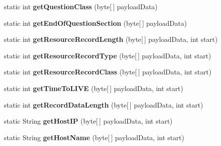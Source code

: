 \begin{DoxyCompactItemize}
\item 
\hypertarget{class_d_n_s_wrapper_aa75a7784f60a728e11bbd791bc3eaa7b}{static int {\bfseries get\-Question\-Class} (byte\mbox{[}$\,$\mbox{]} payload\-Data)}\label{class_d_n_s_wrapper_aa75a7784f60a728e11bbd791bc3eaa7b}

\item 
\hypertarget{class_d_n_s_wrapper_a4f45ea27c7c3190fdb77b68256ce60bb}{static int {\bfseries get\-End\-Of\-Question\-Section} (byte\mbox{[}$\,$\mbox{]} payload\-Data)}\label{class_d_n_s_wrapper_a4f45ea27c7c3190fdb77b68256ce60bb}

\item 
\hypertarget{class_d_n_s_wrapper_aac9fe2199c90c0f5340ee60cb76cf243}{static int {\bfseries get\-Resource\-Record\-Length} (byte\mbox{[}$\,$\mbox{]} payload\-Data, int start)}\label{class_d_n_s_wrapper_aac9fe2199c90c0f5340ee60cb76cf243}

\item 
\hypertarget{class_d_n_s_wrapper_a21ee00dfc1105434ad3bc327db405eae}{static int {\bfseries get\-Resource\-Record\-Type} (byte\mbox{[}$\,$\mbox{]} payload\-Data, int start)}\label{class_d_n_s_wrapper_a21ee00dfc1105434ad3bc327db405eae}

\item 
\hypertarget{class_d_n_s_wrapper_ac0757189b03a33f587fe9143b3caf0e7}{static int {\bfseries get\-Resource\-Record\-Class} (byte\mbox{[}$\,$\mbox{]} payload\-Data, int start)}\label{class_d_n_s_wrapper_ac0757189b03a33f587fe9143b3caf0e7}

\item 
\hypertarget{class_d_n_s_wrapper_a42f4e390e495edb4cb7f078893e8eb6f}{static int {\bfseries get\-Time\-To\-L\-I\-V\-E} (byte\mbox{[}$\,$\mbox{]} payload\-Data, int start)}\label{class_d_n_s_wrapper_a42f4e390e495edb4cb7f078893e8eb6f}

\item 
\hypertarget{class_d_n_s_wrapper_a720665f14c48c2ad54bf9f1daff058fd}{static int {\bfseries get\-Record\-Data\-Length} (byte\mbox{[}$\,$\mbox{]} payload\-Data, int start)}\label{class_d_n_s_wrapper_a720665f14c48c2ad54bf9f1daff058fd}

\item 
\hypertarget{class_d_n_s_wrapper_a0a027be962bb4f931d483b75b6a488aa}{static String {\bfseries get\-Host\-I\-P} (byte\mbox{[}$\,$\mbox{]} payload\-Data, int start)}\label{class_d_n_s_wrapper_a0a027be962bb4f931d483b75b6a488aa}

\item 
\hypertarget{class_d_n_s_wrapper_a72f8fc75d306b774f5b049a9734559ab}{static String {\bfseries get\-Host\-Name} (byte\mbox{[}$\,$\mbox{]} payload\-Data, int start)}\label{class_d_n_s_wrapper_a72f8fc75d306b774f5b049a9734559ab}


\end{DoxyCompactItemize}
